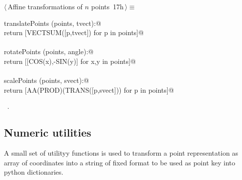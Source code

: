 \documentclass[11pt,oneside]{article}	%
\begin{document}
\begin{flushleft} \small \label{scrap43}
\protect{}$\langle\,$Affine transformations of $n$ points\nobreak\ {\footnotesize 17h}$\,\rangle\equiv$
\vspace{-1ex}
\begin{list}{}{} \item
\mbox{}\verb@def translatePoints (points, tvect):@\\
\mbox{}\verb@   return [VECTSUM([p,tvect]) for p in points]@\\
\mbox{}\verb@@\\
\mbox{}\verb@def rotatePoints (points, angle):@\\
\mbox{}\verb@   return [[COS(x),-SIN(y)] for x,y in points]@\\
\mbox{}\verb@@\\
\mbox{}\verb@def scalePoints (points, svect):@\\
\mbox{}\verb@   return [AA(PROD)(TRANS([p,svect])) for p in points]@\\
\mbox{}\verb@@{\NWsep}
\end{list}
\vspace{-1ex}
\footnotesize\addtolength{\baselineskip}{-1ex}
\begin{list}{}{\setlength{\itemsep}{-\parsep}\setlength{\itemindent}{-\leftmargin}}
\item \NWtxtMacroRefIn\ .
\end{list}
\end{flushleft}

\subsection{Numeric utilities}

A small set of utilityy functions is used to transform a point representation as array of coordinates into a string of fixed format to be used as point key into python dictionaries.
\end{document}
